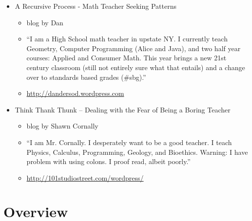 \begin{itemize}
\item A Recursive Process - Math Teacher Seeking Patterns
\begin{itemize}[noitemsep]
\item blog by Dan
\item “I am a High School math teacher in upstate NY. I currently teach Geometry, Computer Programming (Alice and Java), and two half year courses: Applied and Consumer Math. This year brings a new 21st century classroom (still not entirely sure what that entails) and a change over to standards based grades (#sbg).”
\item \url{http://dandersod.wordpress.com }
\end{itemize}

\item Think Thank Thunk – Dealing with the Fear of Being a Boring Teacher 
\begin{itemize} [noitemsep]
\item blog by Shawn Cornally
\item “I am Mr. Cornally. I desperately want to be a good teacher. I teach Physics, Calculus, Programming, Geology, and Bioethics. Warning: I have problem with using colons. I proof read, albeit poorly.”
\item \url{http://101studiostreet.com/wordpress/}
\end{itemize}
\end{itemize}

\section{Overview}
